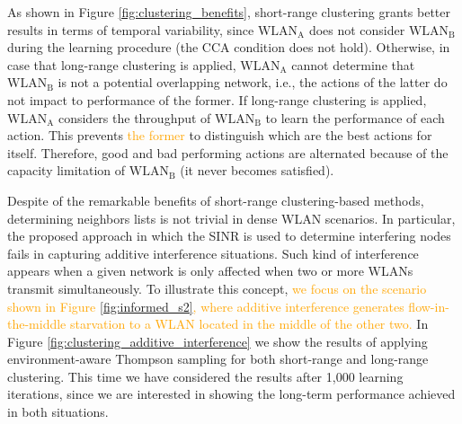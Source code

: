 \documentclass[preprint,12pt]{elsarticle}
\begin{document}
As shown in Figure \ref{fig:clustering_benefits}, short-range clustering grants better results in terms of temporal variability, since $\text{WLAN}_\text{A}$ does not consider $\text{WLAN}_\text{B}$ during the learning procedure (the CCA condition does not hold). Otherwise, in case that long-range clustering is applied, $\text{WLAN}_\text{A}$ cannot determine that $\text{WLAN}_\text{B}$ is not a potential overlapping network, i.e., the actions of the latter do not impact to performance of the former. If long-range clustering is applied, $\text{WLAN}_\text{A}$ considers the throughput of $\text{WLAN}_\text{B}$ to learn the performance of each action. This prevents \textcolor{orange}{the former} to distinguish which are the best actions for itself. Therefore, good and bad performing actions are alternated because of the capacity limitation of $\text{WLAN}_\text{B}$ (it never becomes satisfied).

Despite of the remarkable benefits of short-range clustering-based methods, determining neighbors lists is not trivial in dense WLAN scenarios. In particular, the proposed approach in which the SINR is used to determine interfering nodes fails in capturing additive interference situations. Such kind of interference appears when a given network is only affected when two or more WLANs transmit simultaneously. To illustrate this concept, \textcolor{orange}{we focus on the scenario shown in Figure \ref{fig:informed_s2}, where additive interference generates flow-in-the-middle starvation to a WLAN located in the middle of the other two.} In Figure \ref{fig:clustering_additive_interference} we show the results of applying environment-aware Thompson sampling for both short-range and long-range clustering. This time we have considered the results after 1,000 learning iterations, since we are interested in showing the long-term performance achieved in both situations.
\end{document}
